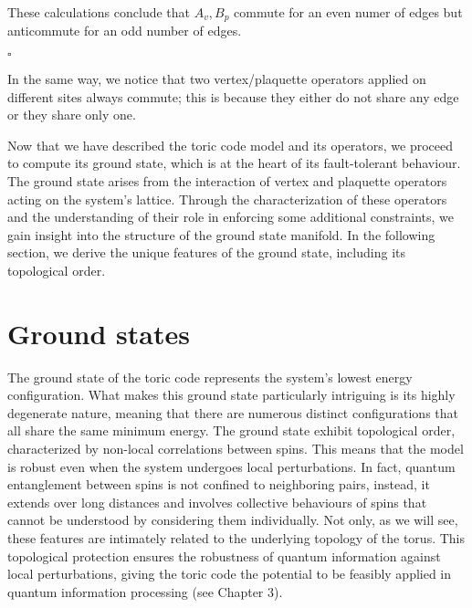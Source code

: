 \documentclass{Configuration_Files/PoliMi3i_thesis}
\begin{document}
These calculations conclude that $A_{v},B_{p}$ commute for an even numer of edges but anticommute for an odd number of edges.\newline

\hfill $\square$\newline

In the same way, we notice that two vertex/plaquette operators applied on different sites always commute; this is because they either do not share any edge or they share only one.\newline

Now that we have described the toric code model and its operators, we proceed to compute its ground state, which is at the heart of its fault-tolerant behaviour. The ground state arises from the interaction of vertex and plaquette operators acting on the system's lattice. Through the characterization of these operators and the understanding of their role in enforcing some additional constraints, we gain insight into the structure of the ground state manifold. \newline
In the following section, we derive the unique features of the ground state, including its topological order. \newline 




















\newpage
\section{Ground states}
\label{sec:GS}

The ground state of the toric code represents the system's lowest energy configuration. What makes this ground state particularly intriguing is its highly degenerate nature, meaning that there are numerous distinct configurations that all share the same minimum energy. 
The ground state exhibit topological order, characterized by non-local correlations between spins. This means that the model is robust  even when the system undergoes local perturbations.  In fact, quantum entanglement between spins is not confined to neighboring pairs, instead, it extends over long distances and involves collective behaviours of spins that cannot be understood by considering them individually.
Not only, as we will see, these features are intimately related to the underlying topology of the torus. This topological protection ensures the robustness of quantum information against local perturbations, giving the toric code the potential to be feasibly applied in quantum information processing (see Chapter 3).\newline
\end{document}

